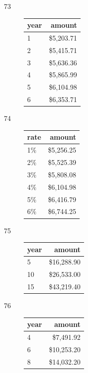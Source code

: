 \documentclass{exam}
\begin{document}
\begin{description}

      \item[73]
        \begin{tabular}[H]{lr}
          \toprule
          year & amount \\
          \midrule
          1    & \$5,203.71 \\
          2    & \$5,415.71 \\
          3    & \$5,636.36 \\
          4    & \$5,865.99 \\
          5    & \$6,104.98 \\
          6    & \$6,353.71 \\
          \bottomrule
        \end{tabular}

      \item[74]
        \begin{tabular}[H]{lr}
          \toprule
          rate & amount \\
          \midrule
          1\% & \$5,256.25 \\
          2\% & \$5,525.39 \\
          3\% & \$5,808.08 \\
          4\% & \$6,104.98 \\
          5\% & \$6,416.79 \\
          6\% & \$6,744.25 \\
          \bottomrule
        \end{tabular}

      \item[75]
        \begin{tabular}[H]{lr}
          \toprule
          year & amount \\
          \midrule
          5    & \$16,288.90 \\
          10   & \$26,533.00 \\
          15   & \$43,219.40 \\
          \bottomrule
        \end{tabular}

      \item[76]
        \begin{tabular}[H]{lr}
          \toprule
          year & amount \\
          \midrule
          4    & \$7,491.92 \\
          6    & \$10,253.20 \\
          8    & \$14,032.20 \\
          \bottomrule
        \end{tabular}


\end{description}
\end{document}
